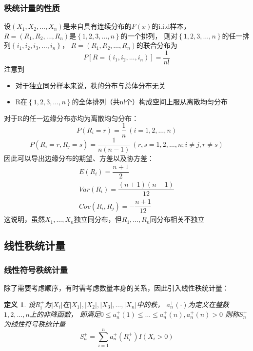 \documentclass[UTF8]{ctexart}
\numberwithin{equation}{section}
\newtheorem{definition}{定义}[section]
\begin{document}
\subsubsection{秩统计量的性质}
设$(X_1, X_2,\dots, X_n)$是来自具有连续分布的$F(x)$的i.i.d样本，
$R = (R_1, R_2, \dots, R_n)$是$\left\{ 1,2,3,\dots,n\right\}$的一个排列，
则对$\left\{ 1,2,3,\dots,n\right\}$的任一排列$\left\{i_1,i_2,i_3,\dots,i_n\right\}$， 
$R = (R_1, R_2, \dots, R_n)$的联合分布为
\begin{equation}
    P[R=(i_1,i_2,\dots,i_n)]=\dfrac{1}{n!}
\end{equation}
注意到
\begin{itemize}
    \item 对于独立同分样本来说，秩的分布与总体分布无关
    \item R在$\left\{ 1,2,3,\dots,n\right\}$的全体排列（共n!个）构成空间上服从离散均匀分布
\end{itemize}
对于R的任一边缘分布亦均为离散均匀分布：
\begin{equation}
    P(R_i = r) = \dfrac{1}{n} ~ (i=1,2,\dots,n)
\end{equation}
\begin{equation}
    P(R_i = r, R_j = s) = \dfrac{1}{n(n-1)} ~ (r,s=1,2,\dots,n;i \neq j,r \neq s)
\end{equation}
因此可以导出边缘分布的期望、方差以及协方差：
\begin{equation}
    \begin{matrix}
        E(R_i) = \dfrac{n+1}{2} \\[1em]
        Var(R_i) = \dfrac{(n+1)(n-1)}{12} \\[1em]
        Cov(R_i, R_j) = -\dfrac{n+1}{12}
    \end{matrix}
    \nonumber
\end{equation}
这说明，虽然$X_1,\dots,X_n$独立同分布，但$R_1,\dots,R_n$同分布相关不独立


\subsection{线性秩统计量}
\subsubsection{线性符号秩统计量}
除了需要考虑顺序，有时需考虑数量本身的关系，因此引入线性秩统计量：
\begin{definition}
    设$R_i^+$为$|X_i|$在$|X_1|,|X_2|,|X_3|,\dots,|X_n|$中的秩，
    $a_n^+ (·)$为定义在整数$1,2,\dots,n$上的非降函数，
    即满足$0 \leq a_n^+ (1) \leq \dots \leq a_n^+ (n),a_n^+ (n)>0$
    则称$S_n^+$为线性符号秩统计量
    \begin{equation}
        S_n^+ = \sum_{i=1}^n a_n^+ (R_i^+) I(X_i>0)
    \end{equation}
\end{definition}
\end{document}
